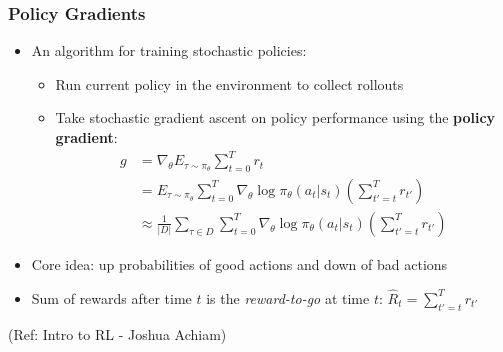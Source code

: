 \begin{frame}[fragile]\frametitle{Policy Gradients}

\begin{itemize}
\item An algorithm for training stochastic policies:
\begin{itemize}
\item Run current policy in the environment to collect rollouts
\item Take stochastic gradient ascent on policy performance using the \textbf{policy gradient}:
\begin{align*}
g &= \nabla_{\theta} E_{\tau \sim \pi_{\theta}}{\sum_{t=0}^T r_t} \\
&= E_{\tau \sim \pi_{\theta}}{\sum_{t=0}^T \nabla_{\theta} \log \pi_{\theta}(a_t | s_t) \left(\sum_{t'=t}^T r_{t'}\right)}\\
&\approx \frac{1}{|D|}\sum_{\tau \in D} \sum_{t=0}^T \nabla_{\theta} \log \pi_{\theta}(a_t | s_t) \left(\sum_{t'=t}^T r_{t'}\right)
\end{align*}
\end{itemize}
\item Core idea: up probabilities of good actions and down of bad actions
\item Sum of rewards after time $t$ is the \textit{reward-to-go} at time $t$: $\hat{R}_t = \sum_{t'=t}^T r_{t'}$
\end{itemize}

{\tiny (Ref: Intro to RL - Joshua Achiam)}


\end{frame}

